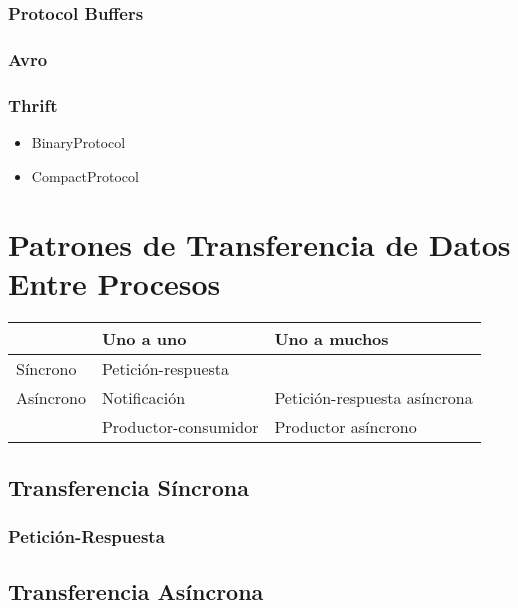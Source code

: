 \subsubsection{Protocol Buffers}
\subsubsection{Avro}
\subsubsection{Thrift}

\begin{itemize}
  \item BinaryProtocol 
  \item CompactProtocol
\end{itemize}

\section{Patrones de Transferencia de Datos Entre Procesos}

\begin{table}[]
  \begin{tabular}{@{}lll@{}}
  \toprule
            & Uno a uno            & Uno a muchos                 \\ \midrule
  Síncrono  & Petición-respuesta   &                              \\ \midrule
  Asíncrono & Notificación         & Petición-respuesta asíncrona \\ 
            & Productor-consumidor & Productor asíncrono          \\ \bottomrule
  \end{tabular}
\end{table}

\subsection{Transferencia Síncrona}

\subsubsection{Petición-Respuesta}

\subsection{Transferencia Asíncrona}

